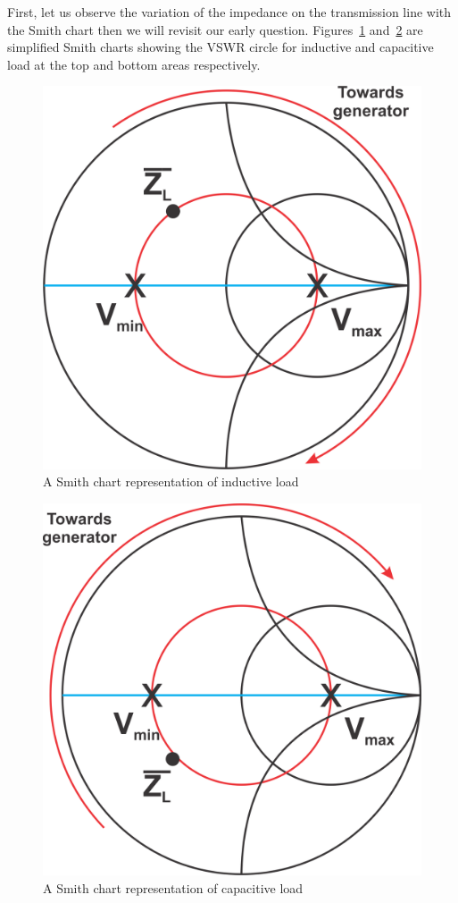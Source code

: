First, let us observe the variation of the impedance on the transmission line with the Smith chart then we will revisit our early question. Figures~\ref{fig:group91} and~\ref{fig:group92} are simplified Smith charts showing the VSWR circle for inductive and capacitive load at the top and bottom areas respectively.
\begin{figure}[h]
\centering
\includegraphics[scale=0.4]{./graphics/Group91}
\caption{A Smith chart representation of inductive load}
\label{fig:group91}
\end{figure}
\begin{figure}[h]
\centering
\includegraphics[scale=0.4]{./graphics/Group92}
\caption{A Smith chart representation of capacitive load}
\label{fig:group92}
\end{figure}


